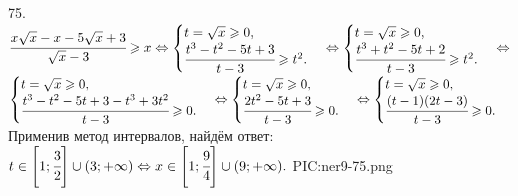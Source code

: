 75. $\cfrac{x\sqrt{x}-x-5\sqrt{x}+3}{\sqrt{x}-3}\geqslant x \Leftrightarrow \begin{cases} t=\sqrt{x}\geqslant0,\\ \cfrac{t^3-t^2-5t+3}{t-3}\geqslant t^2.\end{cases}
\Leftrightarrow \begin{cases} t=\sqrt{x}\geqslant0,\\ \cfrac{t^3+t^2-5t+2}{t-3}\geqslant t^2.\end{cases}
\Leftrightarrow$\\$ \begin{cases} t=\sqrt{x}\geqslant0,\\ \cfrac{t^3-t^2-5t+3-t^3+3t^2}{t-3}\geqslant 0.\end{cases}
\Leftrightarrow \begin{cases} t=\sqrt{x}\geqslant0,\\ \cfrac{2t^2-5t+3}{t-3}\geqslant 0.\end{cases}
\Leftrightarrow \begin{cases} t=\sqrt{x}\geqslant0,\\ \cfrac{(t-1)(2t-3)}{t-3}\geqslant 0.\end{cases}$ Применив метод интервалов, найдём ответ: $t\in\left[1;\cfrac{3}{2}\right]\cup(3;+\infty)\Leftrightarrow x \in\left[1;\cfrac{9}{4}\right]\cup(9;+\infty).$
{{PIC:ner9-75.png}}\\
